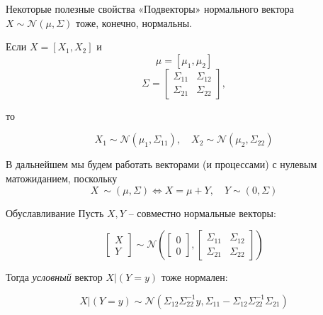 \documentclass[fullscreen=true, bookmarks=true, hyperref={pdfencoding=unicode}]{beamer}
\begin{document}
\begin{frame}{Некоторые полезные свойства}
    «Подвекторы» нормального вектора $ X \sim \mathcal{N}(\mu, \Sigma) $ тоже, конечно, нормальны.

    Если $ X = [X_1, X_2 ] $ и
    $$ \mu = [\mu_1, \mu_2] $$
    $$ \Sigma = \begin{bmatrix} \Sigma_{11} & \Sigma_{12} \\ \Sigma_{21} & \Sigma_{22} \end{bmatrix}, $$

    то

    $$ X_1 \sim \mathcal{N}(\mu_1, \Sigma_{11}), \quad X_2 \sim \mathcal{N}(\mu_2, \Sigma_{22}) $$

    \pause
    В дальнейшем мы будем работать векторами (и процессами) с нулевым матожиданием, поскольку
    $$ X ~ \sim(\mu, \Sigma) \Leftrightarrow X = \mu + Y, \quad Y \sim(0, \Sigma) $$
\end{frame}

\begin{frame}{Обуславливание}
   Пусть $ X, Y $ -- совместно нормальные векторы:

    $$ \begin{bmatrix} X \\ Y \end{bmatrix} \sim \mathcal{N}\left( \begin{bmatrix} 0 \\ 0\end{bmatrix}, \begin{bmatrix} \Sigma_{11} & \Sigma_{12} \\ \Sigma_{21} & \Sigma_{22} \end{bmatrix} \right) $$

    \pause
    \vspace{1cm}
    Тогда \textit{условный} вектор $ X | (Y = y) $ тоже нормален:

    $$ X | (Y = y) \sim \mathcal{N}\left( \Sigma_{12} \Sigma_{22}^{-1} y, \Sigma_{11} - \Sigma_{12} \Sigma_{22}^{-1} \Sigma_{21} \right) $$
\end{frame}
\end{document}
